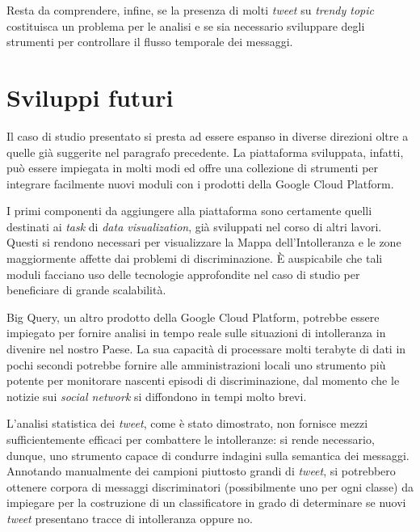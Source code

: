 Resta da comprendere, infine, se la presenza di molti \textit{tweet} su \textit{trendy topic} costituisca un problema per le analisi e se sia necessario sviluppare degli 
strumenti per controllare il flusso temporale dei messaggi.


\chapter*{Sviluppi futuri}

Il caso di studio presentato si presta ad essere espanso in diverse direzioni oltre a quelle già suggerite nel paragrafo precedente.
La piattaforma sviluppata, infatti, può essere impiegata in molti modi ed offre una collezione di strumenti per integrare facilmente nuovi moduli con i prodotti della 
Google Cloud Platform. 

I primi componenti da aggiungere alla piattaforma sono certamente quelli destinati ai \textit{task} di \textit{data visualization}, già sviluppati nel corso di altri lavori.
Questi si rendono necessari per visualizzare la Mappa dell'Intolleranza e le zone maggiormente affette dai problemi di discriminazione.
È auspicabile che tali moduli facciano uso delle tecnologie approfondite nel caso di studio per beneficiare di grande scalabilità.

Big Query, un altro prodotto della Google Cloud Platform, potrebbe essere impiegato per fornire analisi in tempo reale sulle situazioni di intolleranza in divenire 
nel nostro Paese.
La sua capacità di processare molti terabyte di dati in pochi secondi potrebbe fornire alle amministrazioni locali uno strumento più potente per monitorare 
nascenti episodi di discriminazione, dal momento che le notizie sui \textit{social network} si diffondono in tempi molto brevi.

L'analisi statistica dei \textit{tweet}, come è stato dimostrato, non fornisce mezzi sufficientemente efficaci per combattere le intolleranze: si rende necessario, dunque, uno 
strumento capace di condurre indagini sulla semantica dei messaggi. Annotando manualmente dei campioni piuttosto grandi di \textit{tweet}, si potrebbero ottenere corpora di messaggi 
discriminatori (possibilmente uno per ogni classe) da impiegare per la costruzione di un classificatore in grado di determinare se nuovi 
\textit{tweet} presentano tracce di intolleranza oppure no.

